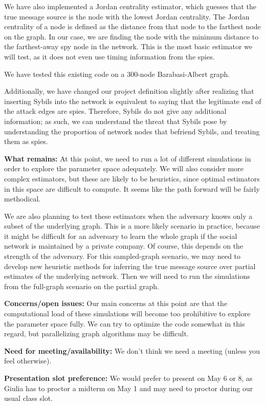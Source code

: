 \documentclass[11pt, onecolumn]{article}
\begin{document}
We have also implemented a Jordan centrality estimator, which guesses that the true message source is the node with the lowest Jordan centrality. The Jordan centrality of a node is defined as the distance from that node to the farthest node on the graph. In our case, we are finding the node with the minimum distance to the farthest-away spy node in the network. This is the most basic estimator we will test, as it does not even use timing information from the spies.

We have tested this existing code on a 300-node Barabasi-Albert graph. 

Additionally, we have changed our project definition slightly after realizing that inserting Sybils into the network is equivalent to saying that the legitimate end of the attack edges are spies. Therefore, Sybils do not give any additional information; as such, we can understand the threat that Sybils pose by understanding the proportion of network nodes that befriend Sybils, and treating them as spies. 

\vspace{0.1in}
\textbf{What remains:} At this point, we need to run a lot of different simulations in order to explore the parameter space adequately. We will also consider more complex estimators, but these are likely to be heuristics, since optimal estimators in this space are difficult to compute. It seems like the path forward will be fairly methodical.

We are also planning to test these estimators when the adversary knows only a subset of the underlying graph. This is a more likely scenario in practice, because it might be difficult for an adversary to learn the whole graph if the social network is maintained by a private company. Of course, this depends on the strength of the adversary. For this sampled-graph scenario, we may need to develop new heuristic methods for inferring the true message source over partial estimates of the underlying network. Then we will need to run the simulations from the full-graph scenario on the partial graph. 

\vspace{0.1in}
\textbf{Concerns/open issues:}
Our main concerns at this point are that the computational load of these simulations will become too prohibitive to explore the parameter space fully. We can try to optimize the code somewhat in this regard, but parallelizing graph algorithms may be difficult. 

\vspace{0.1in}
\textbf{Need for meeting/availability:} We don’t think we need a meeting (unless you feel otherwise).

\vspace{0.1in}
\textbf{Presentation slot preference:} We would prefer to present on May 6 or 8, as Giulia has to proctor a midterm on May 1 and may need to proctor during our usual class slot.
%
%
\end{document}
